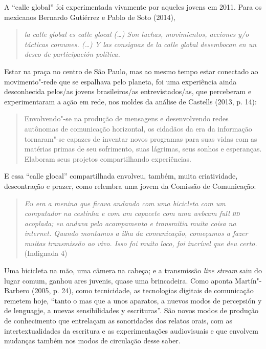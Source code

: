 A ``calle global'' foi experimentada vivamente por aqueles jovens em
2011. Para os mexicanos Bernardo Gutiérrez e Pablo de Soto (2014),

\begin{quote}
\emph{la calle global es calle glocal (\ldots{}) Son luchas, movimientos,
acciones y/o tácticas comunes. (\ldots{}) Y las consignas de la calle global
desembocan en un deseo de participación política. }
\end{quote}

Estar na praça no centro de São Paulo, mas ao mesmo tempo estar
conectado ao movimento"-rede que se espalhava pelo planeta, foi uma
experiência ainda desconhecida pelos/as jovens brasileiros/as
entrevistados/as, que perceberam e experimentaram a ação em rede, nos
moldes da análise de Castells (2013, p. 14):

\begin{quote}
Envolvendo"-se na produção de mensagens e desenvolvendo redes autônomas
de comunicação horizontal, os cidadãos da era da informação tornaram"-se
capazes de inventar novos programas para suas vidas com as matérias
primas de seu sofrimento, suas lágrimas, seus sonhos e esperanças.
Elaboram seus projetos compartilhando experiências.
\end{quote}

E essa ``calle glocal'' compartilhada envolveu, também, muita
criatividade, descontração e prazer, como relembra uma jovem da Comissão
de Comunicação:

\begin{quote}
\emph{Eu era a menina que ficava andando com uma bicicleta com um
computador na cestinha e com um capacete com uma webcam full \textsc{hd}
acoplada; eu andava pelo acampamento e transmitia muita coisa na
internet. Quando montamos a ilha da comunicação, começamos a fazer
muitas transmissão ao vivo. Isso foi muito loco, foi incrível que deu
certo.} (Indignada 4)
\end{quote}

Uma bicicleta na mão, uma câmera na cabeça; e a transmissão \emph{live
stream} saiu do lugar comum, ganhou ares juvenis, quase uma brincadeira.
Como aponta Martín"-Barbero (2005, p. 24), como tecnicidade, as
tecnologias digitais de comunicação remetem hoje, ``tanto o mas que a
unos aparatos, a nuevos modos de percepsión y de lenguagje, a nuevas
sensibilidades y escrituras''. São novos modos de produção de
conhecimento que entrelaçam as sonoridades dos relatos orais, com as
intertextualidades da escritura e as experimentações audiovisuais e que
envolvem mudanças também nos modos de circulação desse saber.


